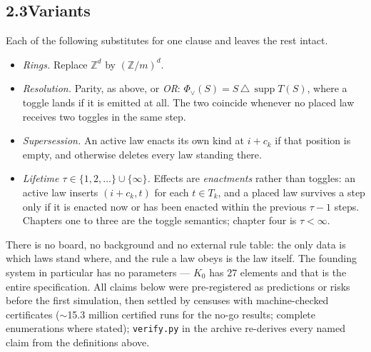 \documentclass[10pt]{article}
\theoremstyle{definition}
\theoremstyle{remark}
\begin{document}
\subsection*{2.3\quad Variants}
Each of the following substitutes for one clause and leaves the rest intact.
\begin{itemize}\itemsep1pt \parskip0pt
\item \emph{Rings.} Replace $\mathbb{Z}^d$ by $(\mathbb{Z}/m)^d$.
\item \emph{Resolution.} Parity, as above, or \emph{OR}:
 $\Phi_{\vee}(S)=S\,\triangle\,\operatorname{supp}T(S)$, where a toggle lands if
 it is emitted at all. The two coincide whenever no placed law receives two
 toggles in the same step.
\item \emph{Supersession.} An active law enacts its own kind at $i+c_k$ if that
 position is empty, and otherwise deletes every law standing there.
\item \emph{Lifetime $\tau\in\{1,2,\dots\}\cup\{\infty\}$.} Effects are
 \emph{enactments} rather than toggles: an active law inserts $(i+c_k,t)$ for
 each $t\in T_k$, and a placed law survives a step only if it is enacted now or
 has been enacted within the previous $\tau-1$ steps. Chapters one to three are
 the toggle semantics; chapter four is $\tau<\infty$.
\end{itemize}

\noindent There is no board, no background and no external rule table: the only
data is which laws stand where, and the rule a law obeys is the law itself. The
founding system in particular has no parameters --- $K_0$ has $27$ elements and
that is the entire specification. All claims below were pre-registered as
predictions or risks before the first simulation, then settled by censuses with
machine-checked certificates ($\sim$15.3 million certified runs for the no-go
results; complete enumerations where stated); \texttt{verify.py} in the archive
re-derives every named claim from the definitions above.
\end{document}
